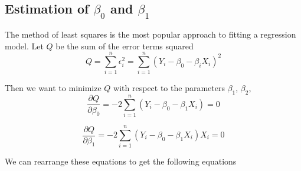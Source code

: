 \subsection{Estimation of $\beta_0$ and $\beta_1$}
The method of least squares is the most popular approach to fitting a regression model. Let $Q$ be the sum of the error terms squared 
\[Q = \sum_{i=1}^n \epsilon_i^2 = \sum_{i=1}^n (Y_i - \beta_0 - \beta_iX_i)^2\]

Then we want to minimize $Q$ with respect to the parameters $\beta_1$, $\beta_2$, 
\[\frac{\partial Q}{\partial \beta_0} = -2\sum_{i=1}^n (Y_i - \beta_0 - \beta_1X_i) = 0\]

\[\frac{\partial Q}{\partial \beta_1} = -2\sum_{i=1}^n (Y_i - \beta_0 - \beta_1X_i)X_i = 0\]    

We can rearrange these equations to get the following equations 

